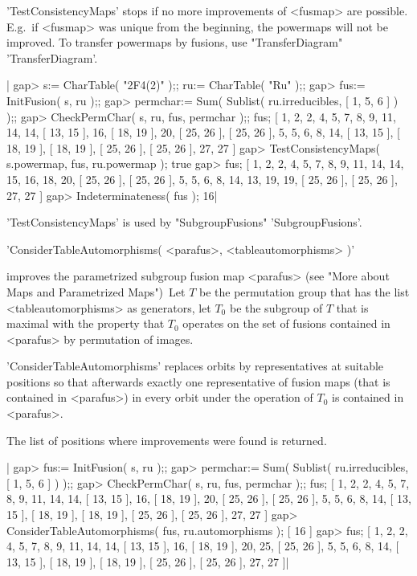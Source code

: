 'TestConsistencyMaps' stops if no more improvements of <fusmap> are
possible.
E.g.\ if <fusmap> was unique from the beginning, the powermaps will not
be improved.  To transfer powermaps by fusions, use "TransferDiagram"
'TransferDiagram'.

|    gap> s:= CharTable( "2F4(2)" );; ru:= CharTable( "Ru" );;
    gap> fus:= InitFusion( s, ru );;
    gap> permchar:= Sum( Sublist( ru.irreducibles, [ 1, 5, 6 ] ) );;
    gap> CheckPermChar( s, ru, fus, permchar );; fus;
    [ 1, 2, 2, 4, 5, 7, 8, 9, 11, 14, 14, [ 13, 15 ], 16, [ 18, 19 ], 20, 
      [ 25, 26 ], [ 25, 26 ], 5, 5, 6, 8, 14, [ 13, 15 ], [ 18, 19 ],
      [ 18, 19 ], [ 25, 26 ], [ 25, 26 ], 27, 27 ]
    gap> TestConsistencyMaps( s.powermap, fus, ru.powermap );
    true
    gap> fus;
    [ 1, 2, 2, 4, 5, 7, 8, 9, 11, 14, 14, 15, 16, 18, 20, [ 25, 26 ],
      [ 25, 26 ], 5, 5, 6, 8, 14, 13, 19, 19, [ 25, 26 ], [ 25, 26 ], 27,
      27 ]
    gap> Indeterminateness( fus );
    16|

'TestConsistencyMaps' is used by "SubgroupFusions" 'SubgroupFusions'.


'ConsiderTableAutomorphisms( <parafus>, <tableautomorphisms> )'

improves the parametrized subgroup fusion map <parafus> (see "More about
Maps and Parametrized Maps")\:\ 
Let $T$ be the permutation group that has the list <tableautomorphisms> as
generators, let $T_0$ be the subgroup of $T$ that is maximal with the property
that $T_0$ operates on the set of fusions contained in <parafus> by
permutation of images.

'ConsiderTableAutomorphisms' replaces orbits by representatives at suitable
positions so that afterwards exactly one representative of fusion maps
(that is contained in <parafus>) in every orbit under the operation of $T_0$
is contained in <parafus>.

The list of positions where improvements were found is returned.

|    gap> fus:= InitFusion( s, ru );;
    gap> permchar:= Sum( Sublist( ru.irreducibles, [ 1, 5, 6 ] ) );;
    gap> CheckPermChar( s, ru, fus, permchar );; fus;
    [ 1, 2, 2, 4, 5, 7, 8, 9, 11, 14, 14, [ 13, 15 ], 16, [ 18, 19 ], 20, 
      [ 25, 26 ], [ 25, 26 ], 5, 5, 6, 8, 14, [ 13, 15 ], [ 18, 19 ],
      [ 18, 19 ], [ 25, 26 ], [ 25, 26 ], 27, 27 ]
    gap> ConsiderTableAutomorphisms( fus, ru.automorphisms );
    [ 16 ]
    gap> fus;
    [ 1, 2, 2, 4, 5, 7, 8, 9, 11, 14, 14, [ 13, 15 ], 16, [ 18, 19 ], 20,
      25, [ 25, 26 ], 5, 5, 6, 8, 14, [ 13, 15 ], [ 18, 19 ], [ 18, 19 ],
      [ 25, 26 ], [ 25, 26 ], 27, 27 ]|

